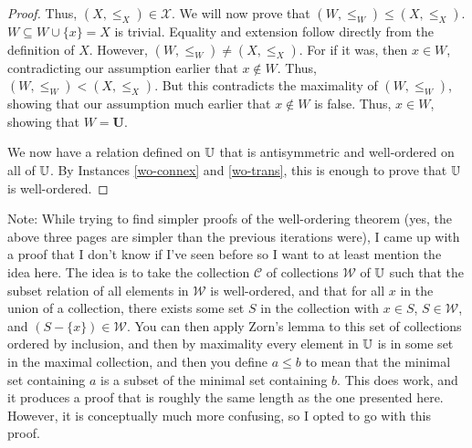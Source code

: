 \documentclass[../math.tex]{subfiles}
\begin{document}
\begin{proof}
    Thus, $(X, \leq_X) \in \mathcal X$.  We will now prove that $(W, \leq_W)
    \leq (X, \leq_X)$.  $W \subseteq W \cup \{x\} = X$ is trivial.  Equality and
    extension follow directly from the definition of $X$.  However, $(W, \leq_W)
    \neq (X, \leq_X)$.  For if it was, then $x \in W$, contradicting our
    assumption earlier that $x \notin W$.  Thus, $(W, \leq_W) < (X, \leq_X)$.
    But this contradicts the maximality of $(W, \leq_W)$, showing that our
    assumption much earlier that $x \notin W$ is false.  Thus, $x \in W$,
    showing that $W = \bm U$.

    We now have a relation defined on $\mathbb{U}$ that is antisymmetric and
    well-ordered on all of $\mathbb{U}$.  By Instances \ref{wo-connex} and
    \ref{wo-trans}, this is enough to prove that $\mathbb{U}$ is well-ordered.
\end{proof}

Note: While trying to find simpler proofs of the well-ordering theorem (yes, the
above three pages are simpler than the previous iterations were), I came up with
a proof that I don't know if I've seen before so I want to at least mention the
idea here.  The idea is to take the collection $\mathcal C$ of collections
$\mathcal W$ of $\mathbb{U}$ such that the subset relation of all elements in $\mathcal
W$ is well-ordered, and that for all $x$ in the union of a collection, there
exists some set $S$ in the collection with $x \in S$, $S \in \mathcal W$, and
$(S - \{x\}) \in \mathcal W$.  You can then apply Zorn's lemma to this set of
collections ordered by inclusion, and then by maximality every element in $\mathbb{U}$
is in some set in the maximal collection, and then you define $a \leq b$ to mean
that the minimal set containing $a$ is a subset of the minimal set containing
$b$.  This does work, and it produces a proof that is roughly the same length as
the one presented here.  However, it is conceptually much more confusing, so I
opted to go with this proof.
\end{document}
